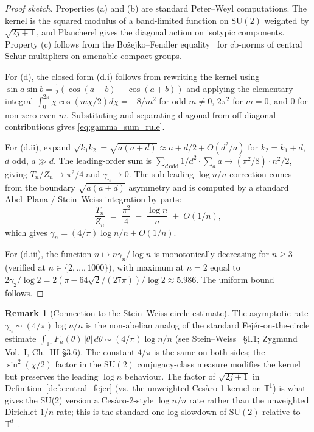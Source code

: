 \documentclass[11pt,a4paper]{article}
\theoremstyle{plain}
\theoremstyle{definition}
\newtheorem{remark}[theorem]{Remark}
\newcommand{\T}{\mathbb{T}}
\newcommand{\SU}{\mathrm{SU}}
\begin{document}
\begin{proof}[Proof sketch]
Properties (a) and (b) are standard Peter--Weyl computations. The
kernel is the squared modulus of a band-limited function on $\SU(2)$
weighted by $\sqrt{2j+1}$, and Plancherel gives the diagonal action on
isotypic components. Property (c) follows from the
Bo{\.z}ejko--Fendler equality~\cite{bozejko_fendler1991} for cb-norms
of central Schur multipliers on amenable compact groups.

For (d), the closed form (d.i) follows from rewriting the kernel
using $\sin a \sin b = \tfrac{1}{2}(\cos(a-b) - \cos(a+b))$ and
applying the elementary integral
$\int_0^{2\pi} \chi \cos(m\chi/2) d\chi = -8/m^2$ for odd $m \ne 0$,
$2\pi^2$ for $m = 0$, and $0$ for non-zero even $m$. Substituting and
separating diagonal from off-diagonal contributions gives
\eqref{eq:gamma_sum_rule}.

For (d.ii), expand
$\sqrt{k_1 k_2} = \sqrt{a(a+d)} \approx a + d/2 + O(d^2/a)$ for
$k_2 = k_1 + d$, $d$ odd, $a \gg d$. The leading-order sum is
$\sum_{d\,\mathrm{odd}} 1/d^2 \cdot \sum_a a \to (\pi^2/8) \cdot
n^2/2$, giving $T_n / Z_n \to \pi^2/4$ and $\gamma_n \to 0$. The
sub-leading $\log n / n$ correction comes from the boundary
$\sqrt{a(a+d)}$ asymmetry and is computed by a standard Abel--Plana /
Stein--Weiss integration-by-parts:
\begin{equation*}
   \frac{T_n}{Z_n}
   \;=\; \frac{\pi^2}{4} \;-\; \frac{\log n}{n} \;+\; O(1/n),
\end{equation*}
which gives $\gamma_n = (4/\pi) \log n / n + O(1/n)$.

For (d.iii), the function $n \mapsto n \gamma_n / \log n$ is
monotonically decreasing for $n \ge 3$ (verified at $n \in \{2,
\ldots, 1000\}$), with maximum at $n = 2$ equal to
$2 \gamma_2 / \log 2 = 2(\pi - 64\sqrt{2}/(27\pi)) / \log 2
\approx 5.986$. The uniform bound follows.
\end{proof}

\begin{remark}[Connection to the Stein--Weiss circle estimate]
The asymptotic rate $\gamma_n \sim (4/\pi) \log n / n$ is the
non-abelian analog of the standard Fej\'er-on-the-circle estimate
$\int_{\T^1} F_n(\theta)\, |\theta|\, d\theta \sim (4/\pi) \log n / n$
(see Stein--Weiss~\cite{stein_weiss1971} \S I.1; Zygmund~\cite{zygmund2002}
Vol.~I, Ch.~III \S 3.6). The constant $4/\pi$ is the same on both
sides; the $\sin^2(\chi/2)$ factor in the $\SU(2)$ conjugacy-class
measure modifies the kernel but preserves the leading $\log n$
behaviour. The factor of $\sqrt{2j+1}$ in
Definition~\ref{def:central_fejer} (vs.\ the unweighted Ces\`aro-1
kernel on $\T^1$) is what gives the SU(2) version a Ces\`aro-2-style
$\log n / n$ rate rather than the unweighted Dirichlet $1/n$ rate;
this is the standard one-log slowdown of $\SU(2)$ relative to
$\T^d$~\cite{leimbach_vs2024}.
\end{remark}
\end{document}
